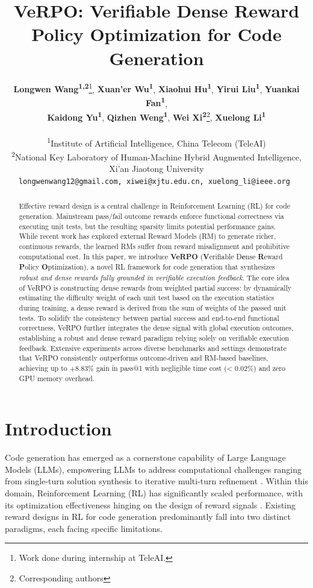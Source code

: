 \documentclass[11pt]{article}
\title{VeRPO: Verifiable Dense Reward Policy Optimization for Code Generation}
\author{
 \textbf{Longwen Wang\textsuperscript{1,2}}\thanks{Work done during internship at TeleAI.},
 \textbf{Xuan'er Wu\textsuperscript{1}},
 \textbf{Xiaohui Hu\textsuperscript{1}},
 \textbf{Yirui Liu\textsuperscript{1}},
 \textbf{Yuankai Fan\textsuperscript{1}},
 \\
 \textbf{Kaidong Yu\textsuperscript{1}},
 \textbf{Qizhen Weng\textsuperscript{1}},
 \textbf{Wei Xi\textsuperscript{2}}\thanks{Corresponding authors},
 \textbf{Xuelong Li\textsuperscript{1}}\samethanks
\\
\\
 \textsuperscript{1}Institute of Artificial Intelligence, China Telecom (TeleAI)
 \\
 \textsuperscript{2}National Key Laboratory of Human-Machine Hybrid Augmented Intelligence, Xi'an Jiaotong University
\\
 {
  \tt\small longwenwang12@gmail.com, xiwei@xjtu.edu.cn, xuelong\_li@ieee.org
 }
}
\begin{document}
\maketitle
\begin{abstract}
Effective reward design is a central challenge in Reinforcement Learning (RL) for code generation. Mainstream pass/fail outcome rewards enforce functional correctness via executing unit tests, but the resulting sparsity limits potential performance gains. While recent work has explored external Reward Models (RM) to generate richer, continuous rewards, the learned RMs suffer from reward misalignment and prohibitive computational cost. In this paper, we introduce \textbf{VeRPO} (\textbf{V}erifiable D\textbf{e}nse \textbf{R}eward \textbf{P}olicy \textbf{O}ptimization), a novel RL framework for code generation that synthesizes \textit{robust and dense rewards fully grounded in verifiable execution feedback}.
The core idea of VeRPO is constructing dense rewards from weighted partial success: by dynamically estimating the difficulty weight of each unit test based on the execution statistics during training, a dense reward is derived from the sum of weights of the passed unit tests. To solidify the consistency between partial success and end-to-end functional correctness, VeRPO further integrates the dense signal with global execution outcomes, establishing a robust and dense reward paradigm relying solely on verifiable execution feedback.
Extensive experiments across diverse benchmarks and settings demonstrate that VeRPO consistently outperforms outcome-driven and RM-based baselines, achieving up to +8.83\% gain in pass@1 with negligible time cost (< 0.02\%) and zero GPU memory overhead. 
\end{abstract}

\section{Introduction}

Code generation has emerged as a cornerstone capability of Large Language Models (LLMs), empowering LLMs to address computational challenges ranging from single-turn solution synthesis \cite{roziere2023code-single-turn-code,wang2021codet5-single-turn} to iterative multi-turn refinement \cite{dong2025survey-multi-turn-code,zheng2024opencodeinterpreter-multi-turn-code}. Within this domain, Reinforcement Learning (RL) has significantly scaled performance, with its optimization effectiveness hinging on the design of reward signals \cite{mroueh2025reinforcement-rlvrwithcode, chen2025R1-Code-Interpreter, lambert2024tulu-RLVR}. Existing reward designs in RL for code generation predominantly fall into two distinct paradigms, each facing specific limitations.
\end{document}
